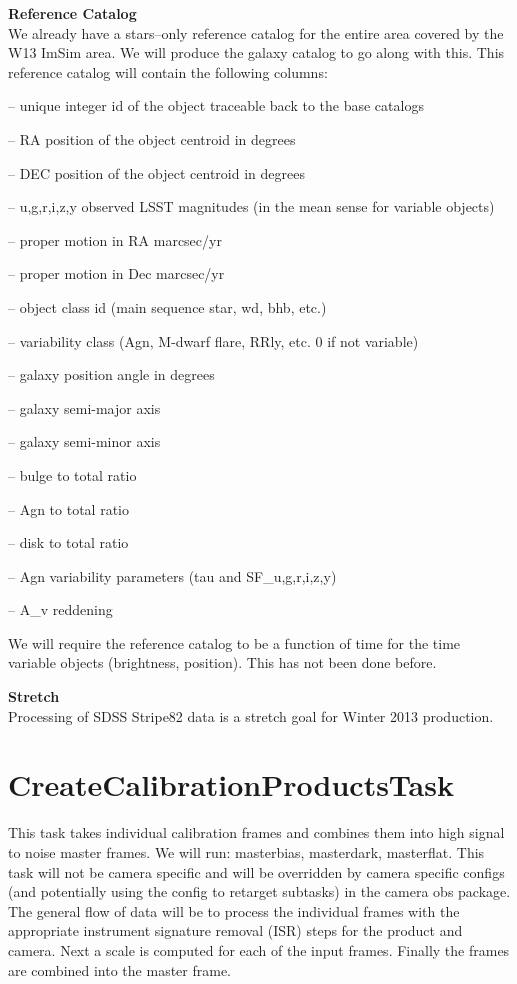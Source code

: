 \documentclass[prd, nofootinbib, floatfix, 11pt,tightenlines,times]{article}
\begin{document}
{\bf Reference Catalog}\\
We already have a stars--only reference catalog for the entire area
covered by the W13 ImSim area.  We will produce the galaxy catalog to
go along with this.  This reference catalog will contain the following
columns:

-- unique integer id of the object traceable back to the base catalogs

-- RA position of the object centroid in degrees

-- DEC position of the object centroid in degrees

-- {u,g,r,i,z,y} observed LSST magnitudes (in the mean sense for variable objects)

-- proper motion in RA marcsec/yr

-- proper motion in Dec marcsec/yr

-- object class id (main sequence star, wd, bhb, etc.)

-- variability class (Agn, M-dwarf flare, RRly, etc.  0 if not variable)

-- galaxy position angle in degrees 

-- galaxy semi-major axis 

-- galaxy semi-minor axis

-- bulge to total ratio

-- Agn to total ratio

-- disk to total ratio

-- Agn variability parameters (tau and SF\_{u,g,r,i,z,y})

-- A\_v reddening 


We will require the reference catalog to be a function of time for
the time variable objects (brightness, position).  This has not been
done before.

{\bf Stretch}\\
Processing of SDSS Stripe82 data is a stretch goal for Winter 2013
production.


\clearpage 
\section{CreateCalibrationProductsTask} 
This task takes individual calibration frames and combines them into
high signal to noise master frames.  We will run: masterbias, masterdark, masterflat.  
This task will not be camera specific and will be overridden by camera specific configs (and potentially
using the config to retarget subtasks) in the camera obs package.  The general flow of data will be to process the individual frames
with the appropriate instrument signature removal (ISR) steps for the product and camera.  Next a scale is computed for each of the input
frames.  Finally the frames are combined into the master frame.
\end{document}
